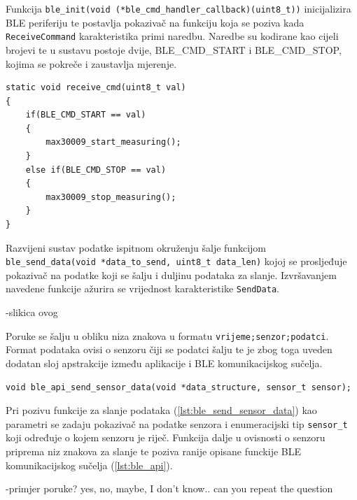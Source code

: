 \documentclass[../diplomski_rad.tex]{subfiles}
\begin{document}
Funkcija \texttt{ble\_init(void (*ble\_cmd\_handler\_callback)(uint8\_t))} inicijalizira BLE periferiju te 
postavlja pokazivač na funkciju koja se poziva kada  \texttt{ReceiveCommand} karakteristika primi naredbu. 
Naredbe su kodirane kao cijeli brojevi te u sustavu postoje dvije, BLE\_CMD\_START i BLE\_CMD\_STOP, kojima se pokreče i zaustavlja mjerenje.  
\begin{lstlisting}[label={lst:ble_received_cmd},style=CStyle,caption={Funkcija koja se poziva kada je primljena naredba},captionpos=b]
static void receive_cmd(uint8_t val)
{
    if(BLE_CMD_START == val)
    {
        max30009_start_measuring();
    }
    else if(BLE_CMD_STOP == val)
    {
        max30009_stop_measuring();
    }
}
\end{lstlisting} 

Razvijeni sustav podatke ispitnom okruženju šalje funkcijom \texttt{ble\_send\_data(void *data\_to\_send, uint8\_t data\_len)} 
kojoj se prosljeđuje pokazivač na podatke koji se šalju i duljinu podataka za slanje. 
Izvršavanjem navedene funkcije ažurira se vrijednost karakteristike \texttt{SendData}.

-slikica ovog

Poruke se šalju u obliku niza znakova u formatu \texttt{vrijeme;senzor;podatci}. Format podataka ovisi o senzoru čiji se podatci šalju te je zbog toga uveden dodatan sloj 
apstrakcije između aplikacije i BLE komunikacijskog sučelja.
\begin{lstlisting}[label={lst:ble_send_sensor_data},style=CStyle,caption={Funkcija za slanje rezultata mjerenja sa pojedinog senzora},captionpos=b]
void ble_api_send_sensor_data(void *data_structure, sensor_t sensor);
\end{lstlisting} 
Pri pozivu funkcije za slanje podataka (\ref{lst:ble_send_sensor_data}) kao parametri se zadaju 
pokazivač na podatke senzora i enumeracijski tip \texttt{sensor\_t} koji određuje o kojem senzoru je riječ.
Funkcija dalje u ovisnosti o senzoru priprema niz znakova za slanje te poziva ranije opisane funckije BLE komunikacijskog sučelja 
(\ref{lst:ble_api}).

-primjer poruke? yes, no, maybe, I don't know.. can you repeat the question
\end{document}
